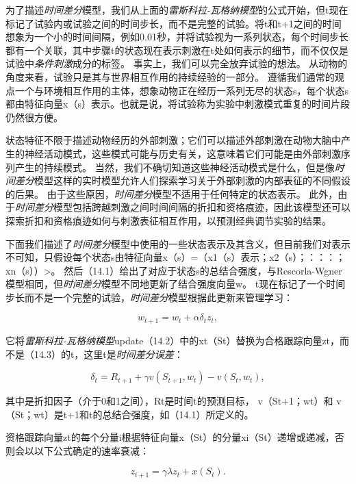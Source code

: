 {	
	
为了描述\textit{时间差分}模型，我们从上面的\textit{雷斯科拉-瓦格纳模型}的公式开始，但t现在标记了试验内或试验之间的时间步长，而不是完整的试验。将t和t+1之间的时间想象为一个小的时间间隔，例如0.01秒，并将试验视为一系列状态，每个时间步长都有一个关联，其中步骤t的状态现在表示刺激在t处如何表示的细节，而不仅仅是试验中\textit{条件刺激}成分的标签。
事实上，我们可以完全放弃试验的想法。
从动物的角度来看，试验只是其与世界相互作用的持续经验的一部分。
遵循我们通常的观点一个与环境相互作用的主体，想象动物正在经历一系列无尽的状态s，每个状态s都由特征向量x（s）表示。也就是说，将试验称为实验中刺激模式重复的时间片段仍然很方便。


状态特征不限于描述动物经历的外部刺激；它们可以描述外部刺激在动物大脑中产生的神经活动模式，这些模式可能与历史有关，这意味着它们可能是由外部刺激序列产生的持续模式。
当然，我们不确切知道这些神经活动模式是什么，但是像\textit{时间差分}模型这样的实时模型允许人们探索学习关于外部刺激的内部表征的不同假设的后果。
由于这些原因，\textit{时间差分}模型不适用于任何特定的状态表示。
此外，由于\textit{时间差分}模型包括跨越刺激之间时间间隔的折扣和资格痕迹，因此该模型还可以探索折扣和资格痕迹如何与刺激表征相互作用，以预测经典调节实验的结果。


下面我们描述了\textit{时间差分}模型中使用的一些状态表示及其含义，但目前我们对表示不可知，只假设每个状态s由特征向量x（s）=（x1（s）表示；x2（s）；：：：；xn（s））>。
然后（14.1）给出了对应于状态s的总结合强度，与Rescorla-Wgner模型相同，但\textit{时间差分}模型不同地更新了结合强度向量w。
t现在标记了一个时间步长而不是一个完整的试验，\textit{时间差分}模型根据此更新来管理学习：

\begin{equation}\label{key}
	w_{t+1} = w_t + \alpha \delta_t z_t,
\end{equation}

它将\textit{雷斯科拉-瓦格纳模型}update（14.2）中的xt（St）替换为合格跟踪向量zt，而不是（14.3）的t，这里t是\textit{时间差分误差}：
	
	
\begin{equation}\label{key}
	\delta_t = 
		R_{t+1} + \gamma v (S_{t+1}, w_t) - v(S_t, w_t),
\end{equation}


其中是折扣因子（介于0和1之间），Rt是时间t的预测目标， v（St+1；wt）和 v（St；wt）是t+1和t的总结合强度，如（14.1）所定义的。


资格跟踪向量zt的每个分量i根据特征向量x（St）的分量xi（St）递增或递减，否则会以以下公式确定的速率衰减：

\begin{equation}\label{key}
	z_{t+1} = \gamma \lambda z_t 
		+ x(S_t).
\end{equation}

}
